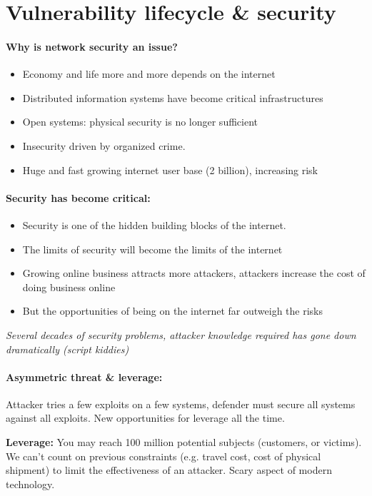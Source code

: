 \section{Vulnerability lifecycle \& security}

\paragraph{Why is network security an issue?}
\begin{itemize}
\item Economy and life more and more depends on the internet
\item Distributed information systems have become critical infrastructures
\item Open systems: physical security is no longer sufficient
\item Insecurity driven by organized crime.
\item Huge and fast growing internet user base (2 billion), increasing risk
\end{itemize}

\paragraph{Security has become critical:}
\begin{itemize}
\item Security is one of the hidden building blocks of the internet.
\item The limits of security will become the limits of the internet
\item Growing online business attracts more attackers, attackers increase
the cost of doing business online
\item But the opportunities of being on the internet far outweigh the risks
\end{itemize}
\emph{Several decades of security problems, attacker knowledge
required has gone down dramatically (script kiddies)}

\paragraph{Asymmetric threat \& leverage:}
Attacker tries a few
exploits on a few systems, defender must
secure all systems against all exploits. New
opportunities for leverage all the time.

\textbf{Leverage:} You may reach 100 million
potential subjects (customers, or victims).
We can't count on previous constraints (e.g.
travel cost, cost of physical shipment) to limit
the effectiveness of an attacker. Scary
aspect of modern technology.

